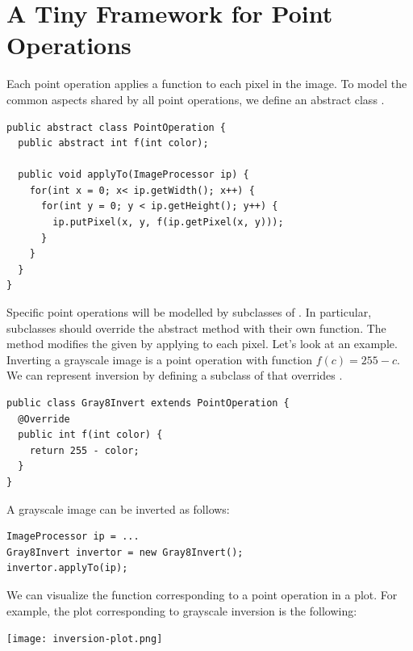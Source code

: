 \documentclass{book}
\begin{document}
\section{A Tiny Framework for Point Operations}
Each point operation applies a function to each pixel in the image. To model the common aspects shared by all point operations, we define an abstract class . 
\begin{lstlisting}
public abstract class PointOperation {
  public abstract int f(int color);
  
  public void applyTo(ImageProcessor ip) {
    for(int x = 0; x< ip.getWidth(); x++) {
      for(int y = 0; y < ip.getHeight(); y++) {
        ip.putPixel(x, y, f(ip.getPixel(x, y)));      
      }    
    }
  }
}
\end{lstlisting}
Specific point operations will be modelled by subclasses of . In particular, subclasses should override the abstract method  with their own function. The method  modifies the given  by applying  to each pixel. Let's look at an example. Inverting a grayscale image is a point operation with function $f(c) = 255 - c$. We can represent inversion by defining a subclass of  that overrides . 
\begin{lstlisting}
public class Gray8Invert extends PointOperation {
  @Override  
  public int f(int color) {
    return 255 - color;
  }
}
\end{lstlisting}
A grayscale image can be inverted as follows:
\begin{lstlisting}
ImageProcessor ip = ...
Gray8Invert invertor = new Gray8Invert();
invertor.applyTo(ip);
\end{lstlisting}
We can visualize the function corresponding to a point operation in a plot. For example, the plot corresponding to grayscale inversion is the following:
\begin{center}
\texttt{[image: inversion-plot.png]} %
\end{center}
\end{document}
